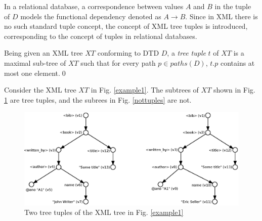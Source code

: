 In a relational database, a correspondence between values $A$ and $B$ in the tuple of $D$ models the functional dependency denoted as $A \rightarrow B$. Since in XML there is no such standard tuple concept, the concept of XML tree tuples is introduced, corresponding to the concept of tuples in relational databases.

\begin{define}\label{treeTuple}
Being given an XML tree $XT$ conforming to DTD $D$, a {\sl tree tuple} $t$ of $XT$ is a maximal sub-tree of $XT$ such that for every path $p \in paths(D)$, $t.p$ contains at most one element.\qed
\end{define}

\begin{example}
Consider the XML tree $XT$ in Fig. \ref{example1}. The subtrees of $XT$ shown in Fig. \ref{tuples} are tree tuples, and the subrees in Fig. \ref{nottuples} are not.

\begin{figure}[H]
    \centering\includegraphics[width=\textwidth]{tuples}
	\caption{Two tree tuples of the XML tree in Fig. \ref{example1}} \label{tuples}
\end{figure}


\end{example}
